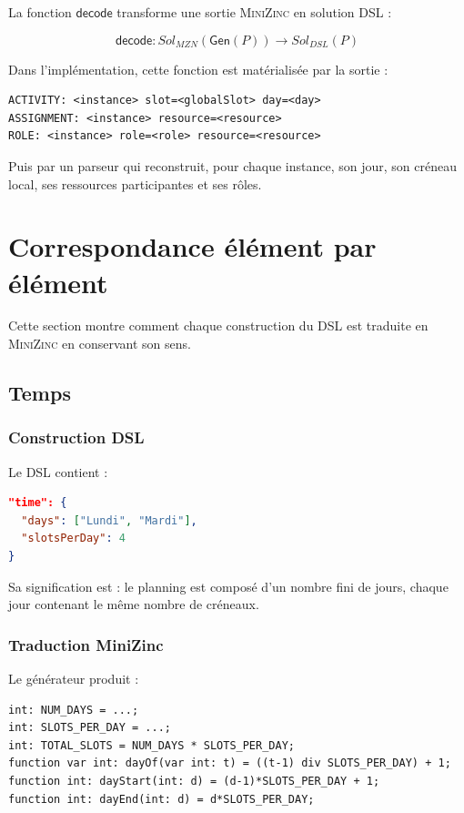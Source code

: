 \documentclass[12pt,a4paper]{article}
\newcommand{\MZN}{\textsc{MiniZinc}}
\newcommand{\decode}{\mathsf{decode}}
\newcommand{\gen}{\mathsf{Gen}}
\begin{document}
La fonction $\decode$ transforme une sortie \MZN{} en solution DSL :

\[
\decode : Sol_{MZN}(\gen(P)) \longrightarrow Sol_{DSL}(P)
\]

Dans l'implémentation, cette fonction est matérialisée par la sortie :

\begin{lstlisting}
ACTIVITY: <instance> slot=<globalSlot> day=<day>
ASSIGNMENT: <instance> resource=<resource>
ROLE: <instance> role=<role> resource=<resource>
\end{lstlisting}

Puis par un parseur qui reconstruit, pour chaque instance, son jour, son créneau local, ses ressources participantes et ses rôles.

\section{Correspondance élément par élément}

Cette section montre comment chaque construction du DSL est traduite en \MZN{} en conservant son sens.

\subsection{Temps}

\subsubsection*{Construction DSL}

Le DSL contient :

\begin{lstlisting}[language=JSON]
"time": {
  "days": ["Lundi", "Mardi"],
  "slotsPerDay": 4
}
\end{lstlisting}

Sa signification est : le planning est composé d'un nombre fini de jours, chaque jour contenant le même nombre de créneaux.

\subsubsection*{Traduction MiniZinc}

Le générateur produit :

\begin{lstlisting}[language=MiniZinc]
int: NUM_DAYS = ...;
int: SLOTS_PER_DAY = ...;
int: TOTAL_SLOTS = NUM_DAYS * SLOTS_PER_DAY;
function var int: dayOf(var int: t) = ((t-1) div SLOTS_PER_DAY) + 1;
function int: dayStart(int: d) = (d-1)*SLOTS_PER_DAY + 1;
function int: dayEnd(int: d) = d*SLOTS_PER_DAY;
\end{lstlisting}
\end{document}
